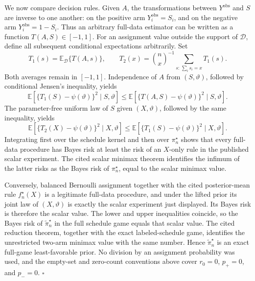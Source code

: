 We now compare decision rules. Given \(A\), the transformations between \(Y^{\mathrm{obs}}\) and \(S\) are inverse to one another: on the positive arm \(Y_i^{\mathrm{obs}}=S_i\), and on the negative arm \(Y_i^{\mathrm{obs}}=1-S_i\). Thus an arbitrary full-data estimator can be written as a function \(T(A,S)\in[-1,1]\). For an assignment value outside the support of \(\mathcal D\), define all subsequent conditional expectations arbitrarily. Set
\[
 T_1(s)=\mathbb E_{\mathcal D}\{T(A,s)\},
 \qquad
 T_2(x)=\binom nx^{-1}
 \sum_{s:\,\sum_i s_i=x}T_1(s).
\]
Both averages remain in \([-1,1]\). Independence of \(A\) from \((S,\vartheta)\), followed by conditional Jensen's inequality, yields
\[
 \mathbb E\!\left[\{T_1(S)-\psi(\vartheta)\}^2
 \mid S,\vartheta\right]
 \leq
 \mathbb E\!\left[\{T(A,S)-\psi(\vartheta)\}^2
 \mid S,\vartheta\right].
\]
The parameter-free uniform law of \(S\) given \((X,\vartheta)\), followed by the same inequality, yields
\[
 \mathbb E\!\left[\{T_2(X)-\psi(\vartheta)\}^2
 \mid X,\vartheta\right]
 \leq
 \mathbb E\!\left[\{T_1(S)-\psi(\vartheta)\}^2
 \mid X,\vartheta\right].
\]
Integrating first over the schedule kernel and then over \(\pi_n^\star\) shows that every full-data procedure has Bayes risk at least the risk of an \(X\)-only rule in the published scalar experiment. The cited scalar minimax theorem identifies the infimum of the latter risks as the Bayes risk of \(\pi_n^\star\), equal to the scalar minimax value.

Conversely, balanced Bernoulli assignment together with the cited posterior-mean rule \(f_n^\star(X)\) is a legitimate full-data procedure, and under the lifted prior its joint law of \((X,\vartheta)\) is exactly the scalar experiment just displayed. Its Bayes risk is therefore the scalar value. The lower and upper inequalities coincide, so the Bayes risk of \(\widetilde\pi_n^\star\) in the full schedule game equals that scalar value. The cited reduction theorem, together with the exact labeled-schedule game, identifies the unrestricted two-arm minimax value with the same number. Hence \(\widetilde\pi_n^\star\) is an exact full-game least-favorable prior. No division by an assignment probability was used, and the empty-set and zero-count conventions above cover \(r_0=0\), \(p_+=0\), and \(p_-=0\). \(\square\)